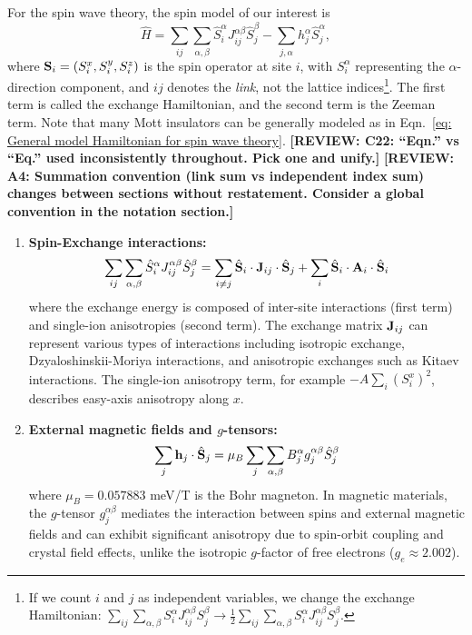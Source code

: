 \documentclass[aps, prx, nofootinbib, superscriptaddress]{revtex4-2}
\newcommand{\REVIEW}[1]{{\color{reviewcolor}\bfseries [REVIEW: #1]}}
\begin{document}
For the spin wave theory, the spin model of our interest is 
\begin{equation}\label{eq: General model Hamiltonian for spin wave theory}
    \hat{H} 
    = \sum_{ij} \sum_{\alpha, \beta} \hat{S}^{\alpha}_{i} J_{ij}^{\alpha\beta}  \hat{S}^{\beta}_{j}  
    -  \sum_{j, \alpha} h_{j}^{\alpha} \hat{S}^{\alpha}_{j},
\end{equation}
where ${\bf S}_{i} = (S^{x}_{i}, S^{y}_{i}, S_{i}^{z})$ is the spin operator at site $i$, with $S^\alpha_i$ representing the $\alpha$-direction component, and $ij$ denotes the \emph{link}, not the lattice indices\footnote{
    If we count $i$ and $j$ as independent variables, we change the exchange Hamiltonian: $\sum_{ij} \sum_{\alpha, \beta} S^{\alpha}_{i} J_{ij}^{\alpha\beta}  S^{\beta}_{j} \rightarrow \frac{1}{2} \sum_{ij} \sum_{\alpha, \beta} S^{\alpha}_{i} J_{ij}^{\alpha\beta} S^{\beta}_{j}$.
}.
The first term is called the exchange Hamiltonian, and the second term is the Zeeman term. 
Note that many Mott insulators can be generally modeled as in Eqn.~\eqref{eq: General model Hamiltonian for spin wave theory}.
\REVIEW{C22: ``Eqn.'' vs ``Eq.'' used inconsistently throughout. Pick one and unify.}
\REVIEW{A4: Summation convention (link sum vs independent index sum) changes between sections without restatement. Consider a global convention in the notation section.}
\begin{enumerate}[label=(\roman*)]
    \item {\bf Spin-Exchange interactions:} 
    \begin{equation}
        \sum_{ij} \sum_{\alpha, \beta} \hat{S}^{\alpha}_{i} J_{ij}^{\alpha\beta}  \hat{S}^{\beta}_{j}  
        = \sum_{i \neq j} \hat{\bf S}_{i} \cdot {\bf J}_{ij} \cdot \hat{\bf S}_{j} + \sum_{i} \hat{\bf S}_{i} \cdot {\bf A}_{i} \cdot \hat{\bf S}_{i}
    \end{equation}
    where the exchange energy is composed of inter-site interactions (first term) and single-ion anisotropies (second term). The exchange matrix ${\bf J}_{ij}$ can represent various types of interactions including isotropic exchange, Dzyaloshinskii-Moriya interactions, and anisotropic exchanges such as Kitaev interactions. The single-ion anisotropy term, for example $- A \sum_{i} (S^{x}_{i})^{2}$, describes easy-axis anisotropy along $x$.
    
    \item {\bf External magnetic fields and $g$-tensors:}
    \begin{equation}
        \sum_{j} {\bf h}_{j} \cdot \hat{\bf S}_{j} = \mu_B \sum_{j} \sum_{\alpha, \beta} B_{j}^{\alpha} g_{j}^{\alpha\beta} \hat{S}^{\beta}_{j}
    \end{equation}
    where $\mu_B = 0.057883$ meV/T is the Bohr magneton. In magnetic materials, the $g$-tensor $g_{j}^{\alpha\beta}$ mediates the interaction between spins and external magnetic fields and can exhibit significant anisotropy due to spin-orbit coupling and crystal field effects, unlike the isotropic $g$-factor of free electrons ($g_e \approx 2.002$).
\end{enumerate}
\end{document}
